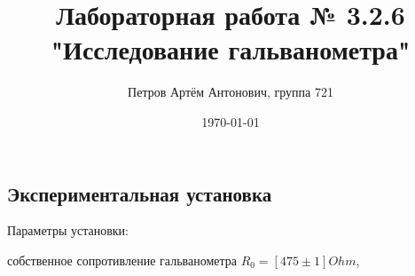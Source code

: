 \documentclass[a4paper,12pt]{article}
\author{Петров Артём Антонович, группа 721}
\title{Лабораторная работа № 3.2.6 "Исследование гальванометра"}
\date{\today}
\begin{document}

\begin{minipage}[t][7cm]{\textwidth}
\maketitle
\end{minipage}



\bigskip

\subsection*{Экспериментальная установка}
\bigskip

Параметры установки: 

собственное сопротивление гальванометра $R_0 = [475 \pm 1] Ohm$,
\end{document}
